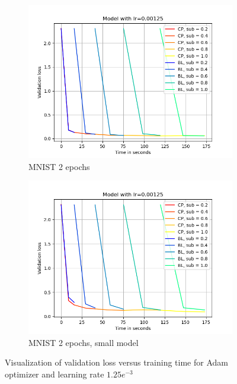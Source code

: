 \begin{figure}[h]
\begin{subfigure}[b]{0.24\textwidth}
        \centering
        \includegraphics[width=\textwidth]{figures/22_07/2ep/loss_time_0.00125.png}
        \caption{MNIST 2 epochs}
        \label{fig:5c}
    \end{subfigure}
    \begin{subfigure}[b]{0.24\textwidth}
        \centering
        \includegraphics[width=\textwidth]{figures/22_07/2ep_smaller/loss_time_0.00125.png}
        \caption{MNIST 2 epochs, small model}
        \label{fig:5d}
    \end{subfigure}
    \caption{Visualization of validation loss versus training time for Adam optimizer and learning rate $1.25e^{-3}$}
    \label{fig:three graphs}
\end{figure}


